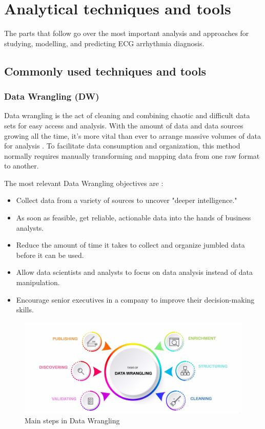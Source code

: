 \chapter{Analytical techniques and tools} \label{chap4}

The parts that follow go over the most important analysis and approaches for studying, modelling, and predicting ECG arrhythmia diagnosis.

\section{Commonly used techniques and tools} \label{4commontools}

\subsection{Data Wrangling (DW)} \label{4dw}

Data wrangling is the act of cleaning and combining chaotic and difficult data sets for easy access and analysis. With the amount of data and data sources growing all the time, it's more vital than ever to arrange massive volumes of data for analysis \cite{datawrang}. To facilitate data consumption and organization, this method normally requires manually transforming and mapping data from one raw format to another.

The most relevant Data Wrangling objectives are \cite{datawrang}:

\begin{itemize}
    \item Collect data from a variety of sources to uncover "deeper intelligence."
    \item As soon as feasible, get reliable, actionable data into the hands of business analysts.
    \item Reduce the amount of time it takes to collect and organize jumbled data before it can be used.
    \item Allow data scientists and analysts to focus on data analysis instead of data manipulation.
    \item Encourage senior executives in a company to improve their decision-making skills.
\end{itemize}

\begin{figure}[H]
\centering
\includegraphics[scale=0.18]{img/DATA_WRANGLING.jpg}
\caption{Main steps in Data Wrangling}
\label{fig:dwprocess}
\end{figure}

